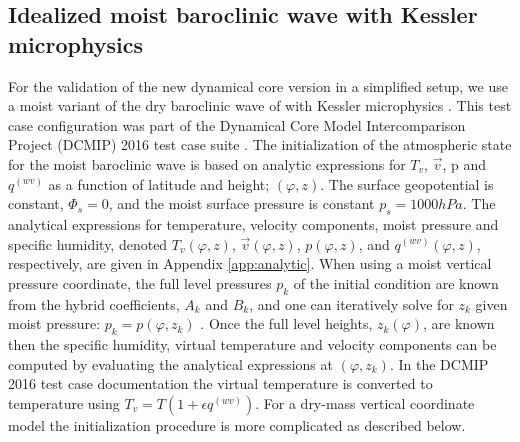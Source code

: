 \documentclass{agujournal}
\begin{document}
{\subsection{Idealized moist baroclinic wave with Kessler microphysics}
For the validation of the new dynamical core version in a simplified setup, we use a moist variant of the dry baroclinic wave of \citet{UMJS2014QJRMS} with Kessler microphysics \citep{K1969MM}. This test case configuration was part of the Dynamical Core Model Intercomparison Project (DCMIP) 2016 test case suite {\color{red}{[DCMIP citation]}}. The initialization of the atmospheric state for the moist baroclinic wave is based on analytic expressions for $T_v$, $\vec{v}$, p and $q^{(wv)}$ as a function of latitude and height; $(\varphi,z)$. The surface geopotential is constant, $\Phi_s=0$, and the moist surface pressure is constant $p_s=1000hPa$. The analytical expressions for temperature, velocity components, moist pressure and specific humidity, denoted ${T_v}(\varphi,z)$, ${\vec{v}}(\varphi,z)$, ${p}(\varphi,z)$, and $q^{(wv)}(\varphi,z)$, respectively, are given in Appendix \ref{app:analytic}. When using a moist vertical pressure coordinate, the full level pressures $p_k$ of the initial condition are known from the hybrid coefficients, $A_k$ and $B_k$, and one can iteratively solve for $z_k$ given moist pressure: $p_k={p}(\varphi,z_k)$ \citep[see, ][]{UMJS2014QJRMS}. Once the full level heights, $z_k(\varphi)$, are known then the specific humidity, virtual temperature and velocity components can be computed by evaluating the analytical expressions at $(\varphi,z_k)$. In the DCMIP 2016 test case documentation the virtual temperature is converted to temperature using $T_v=T\left( 1+\epsilon q^{(wv)}\right)$. For a dry-mass vertical coordinate model the initialization procedure is more complicated as described below.

}
\end{document}
